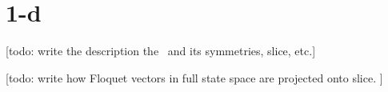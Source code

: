 
\section{1-d \KSe}
\label{sec:ks}

[todo: write the description the \KSe\ and its symmetries, slice, etc.]

[todo: write how Floquet vectors in full state space are projected
onto slice. ]
